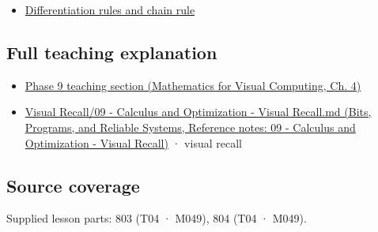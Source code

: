 \begin{itemize}
\tightlist
\item
  \hyperref[appendix-d9f70bdfbc92]{Differentiation rules and chain rule}
\end{itemize}

\subsection{Full teaching explanation}\label{appendix-fecc1847f5a3-full-teaching-explanation}

\begin{itemize}
\tightlist
\item
  \href{../02-Mathematics-for-Visual-Computing/main.pdf\#nameddest=01-foundations-i-ch020-functions-limits-continuity-and-scalar-change}{Phase 9 teaching section (Mathematics for Visual Computing, Ch. 4)}
\item
  \href{../01-Bits-Programs-and-Reliable-Systems/main.pdf\#nameddest=appendix-adf48f5dc5c1}{Visual Recall/09 - Calculus and Optimization - Visual Recall.md (Bits, Programs, and Reliable Systems, Reference notes: 09 - Calculus and Optimization - Visual Recall)} · visual recall
\end{itemize}

\subsection{Source coverage}\label{appendix-fecc1847f5a3-source-coverage}

Supplied lesson parts: 803 (T04 · M049), 804 (T04 · M049).
